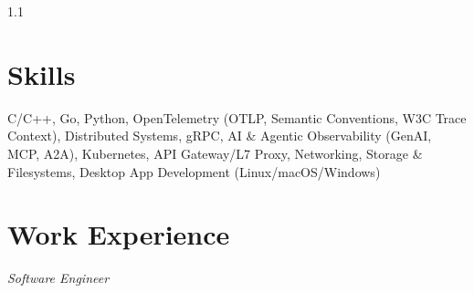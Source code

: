 \documentclass{yijiem}
\begin{document}
\begin{spacing}{1.1}
\end{spacing}

\section{Skills}
    C/C++, Go, Python, OpenTelemetry (OTLP, Semantic Conventions, W3C Trace Context), Distributed Systems, gRPC, AI \& Agentic Observability (GenAI, MCP, A2A), \mbox{Kubernetes}, API Gateway/L7 Proxy, Networking, Storage \& Filesystems, Desktop App Development (Linux/macOS/Windows)

\section{Work Experience}
    \textit{\small Software Engineer}
\end{document}
